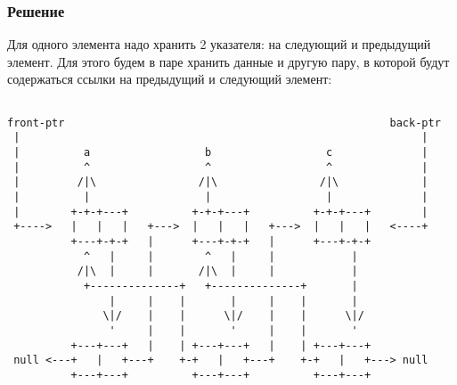 \documentclass[10pt,a4paper]{article}
\begin{document}
\subsubsection*{Решение}
Для одного элемента надо хранить 2 указателя: на следующий и
предыдущий элемент. Для этого будем в паре хранить данные и другую
пару, в которой будут содержаться ссылки на предыдущий и следующий элемент:
\begin{lstlisting}

front-ptr                                                   back-ptr
 |                                                               | 
 |          a                  b                  c              |
 |          ^                  ^                  ^              |
 |         /|\                /|\                /|\             |
 |          |                  |                  |              |
 |        +-+-+---+          +-+-+---+          +-+-+---+        |
 +---->   |   |   |   +--->  |   |   |   +--->  |   |   |   <----+
          +---+-+-+   |      +---+-+-+   |      +---+-+-+ 
            ^   |     |        ^   |     |            |
           /|\  |     |       /|\  |     |            |
            +--------------+   +--------------+       |
                |     |    |       |     |    |       |
               \|/    |    |      \|/    |    |      \|/
                '     |    |       '     |    |       '
          +---+---+   |    | +---+---+   |    | +---+---+
 null <---+   |   +---+    +-+   |   +---+    +-+   |   +---> null
          +---+---+          +---+---+          +---+---+

\end{lstlisting}
\end{document}
